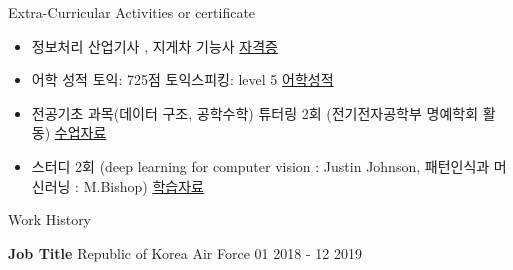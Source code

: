 \documentclass{resume} %
\begin{document}
\begin{rSection}{Extra-Curricular Activities or certificate} 
\begin{itemize}
    \item 	정보처리 산업기사 , 지게차 기능사 \hfill \href{https://drive.google.com/file/d/1JX8xUM_6MWwAQOvcJQmaCyEtvFOLaWOJ/view?usp=sharing}{자격증}
    \item	어학 성적 토익: 725점 토익스피킹: level 5 \hfill \href{https://drive.google.com/drive/folders/1H4DXR4CQHXq4mFMAwLFO_NrHud6FzoZC?usp=sharing}{어학성적}
    \item   전공기초 과목(데이터 구조, 공학수학) 튜터링 2회 (전기전자공학부 명예학회 활동) \hfill \href{https://drive.google.com/drive/folders/1L-axTcvlhgy9s5IZ-QV3aHO7klYvteH9?usp=sharing}{수업자료}
    \item   스터디 2회 (deep learning for computer vision : Justin Johnson, 패턴인식과 머신러닝 : M.Bishop) \hfill \href{https://www.youtube.com/playlist?list=PL5-TkQAfAZFbzxjBHtzdVCWE0Zbhomg7r}{학습자료}
\end{itemize}


\end{rSection}


 


\begin{rSection}{Work History}
\vspace{-1.25em}
\item \textbf{Job Title} {Republic of Korea Air Force} \hfill 01 2018 - 12 2019
\end{rSection} 

\end{document}
